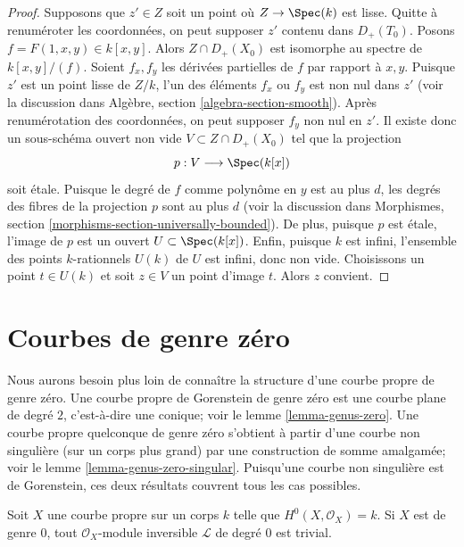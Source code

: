 \begin{proof}
Supposons que $z' \in Z$ soit un point où $Z \to \Spec(k)$ est lisse. Quitte à renuméroter les coordonnées, on peut supposer $z'$ contenu dans $D_+(T_0)$. Posons $f = F(1, x, y) \in k[x, y]$. Alors $Z \cap D_+(X_0)$ est isomorphe au spectre de $k[x, y]/(f)$. Soient $f_x, f_y$ les dérivées partielles de $f$ par rapport à $x, y$. Puisque $z'$ est un point lisse de $Z/k$, l'un des éléments $f_x$ ou $f_y$ est non nul dans $z'$ (voir la discussion dans Algèbre, section \ref{algebra-section-smooth}). Après renumérotation des coordonnées, on peut supposer $f_y$ non nul en $z'$. Il existe donc un sous-schéma ouvert non vide $V \subset Z \cap D_{+}(X_0)$ tel que la projection $$
p : V \longrightarrow \Spec(k[x])
$$ soit \'etale. Puisque le degré de $f$ comme polynôme en $y$ est au plus $d$, les degrés des fibres de la projection $p$ sont au plus $d$ (voir la discussion dans Morphismes, section \ref{morphisms-section-universally-bounded}). De plus, puisque $p$ est \'etale, l'image de $p$ est un ouvert $U \subset \Spec(k[x])$. Enfin, puisque $k$ est infini, l'ensemble des points $k$-rationnels $U(k)$ de $U$ est infini, donc non vide. Choisissons un point $t \in U(k)$ et soit $z \in V$ un point d'image $t$. Alors $z$ convient.
\end{proof}





\section{Courbes de genre zéro}
\label{section-genus-zero}

\noindent
Nous aurons besoin plus loin de connaître la structure d'une courbe propre de genre zéro. Une courbe propre de Gorenstein de genre zéro est une courbe plane de degré $2$, c'est-à-dire une conique; voir le lemme \ref{lemma-genus-zero}. Une courbe propre quelconque de genre zéro s'obtient à partir d'une courbe non singulière (sur un corps plus grand) par une construction de somme amalgamée; voir le lemme \ref{lemma-genus-zero-singular}. Puisqu'une courbe non singulière est de Gorenstein, ces deux résultats couvrent tous les cas possibles.

\begin{lemma}
\label{lemma-genus-zero-pic}
Soit $X$ une courbe propre sur un corps $k$ telle que $H^0(X, \mathcal{O}_X) = k$. Si $X$ est de genre $0$, tout $\mathcal{O}_X$-module inversible $\mathcal{L}$ de degré $0$ est trivial.
\end{lemma}

